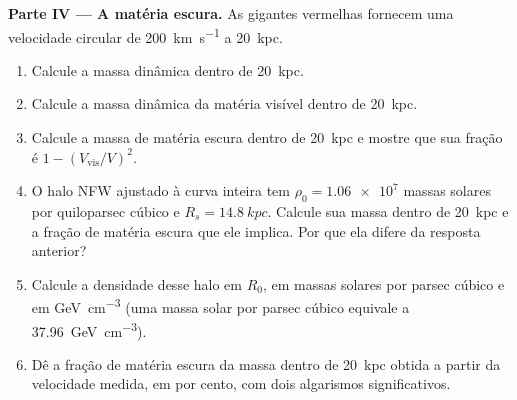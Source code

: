 \begin{problem}
\medskip\noindent\textbf{Parte IV --- A matéria escura.} As gigantes vermelhas
fornecem uma velocidade circular de \qty{200}{km.s^{-1}} a \qty{20}{kpc}.
\begin{enumerate}[resume]
\item Calcule a massa dinâmica dentro de \qty{20}{kpc}.
\item Calcule a massa dinâmica da matéria visível dentro de
  \qty{20}{kpc}.
\item Calcule a massa de matéria escura dentro de \qty{20}{kpc} e mostre que
  sua fração é $1 - (V_\mathrm{vis}/V)^2$.
\item O halo NFW ajustado à curva inteira tem
  $\rho_0 = \num{1.06e7}$ massas solares por quiloparsec cúbico e
  $R_s = \qty{14.8}{kpc}$. Calcule sua massa dentro de \qty{20}{kpc} e a
  fração de matéria escura que ele implica. Por que ela difere da resposta anterior?
\item Calcule a densidade desse halo em $R_0$, em massas solares por
  parsec cúbico e em \unit{GeV.cm^{-3}} (uma massa solar por parsec cúbico
  equivale a \qty{37.96}{GeV.cm^{-3}}).
\item Dê a fração de matéria escura da massa dentro de \qty{20}{kpc}
  obtida a partir da velocidade medida, em por cento, com dois algarismos
  significativos.
\end{enumerate}
\end{problem}
